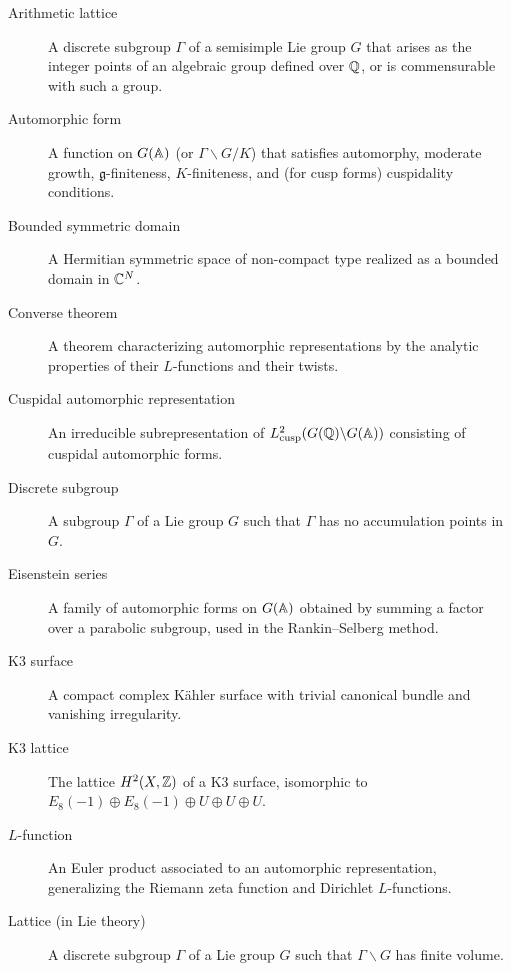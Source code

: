 \begin{description}
    \item[Arithmetic lattice] A discrete subgroup \(\Gamma\) of a semisimple Lie group \(G\) that arises as the integer points of an algebraic group defined over \(\mathbb{Q}\), or is commensurable with such a group.

    \item[Automorphic form] A function on \(G(\mathbb{A})\) (or \(\Gamma \backslash G/K\)) that satisfies automorphy, moderate growth, \(\mathfrak{g}\)-finiteness, \(K\)-finiteness, and (for cusp forms) cuspidality conditions.

    \item[Bounded symmetric domain] A Hermitian symmetric space of non-compact type realized as a bounded domain in \(\mathbb{C}^N\).

    \item[Converse theorem] A theorem characterizing automorphic representations by the analytic properties of their \(L\)-functions and their twists.

    \item[Cuspidal automorphic representation] An irreducible subrepresentation of \(L^2_{\mathrm{cusp}}(G(\mathbb{Q}) \backslash G(\mathbb{A}))\) consisting of cuspidal automorphic forms.

    \item[Discrete subgroup] A subgroup \(\Gamma\) of a Lie group \(G\) such that \(\Gamma\) has no accumulation points in \(G\).

    \item[Eisenstein series] A family of automorphic forms on \(G(\mathbb{A})\) obtained by summing a factor over a parabolic subgroup, used in the Rankin--Selberg method.

    \item[K3 surface] A compact complex K\"{a}hler surface with trivial canonical bundle and vanishing irregularity.

    \item[K3 lattice] The lattice \(H^2(X,\mathbb{Z})\) of a K3 surface, isomorphic to \(E_8(-1) \oplus E_8(-1) \oplus U \oplus U \oplus U\).

    \item[\(L\)-function] An Euler product associated to an automorphic representation, generalizing the Riemann zeta function and Dirichlet \(L\)-functions.

    \item[Lattice (in Lie theory)] A discrete subgroup \(\Gamma\) of a Lie group \(G\) such that \(\Gamma \backslash G\) has finite volume.


\end{description}
